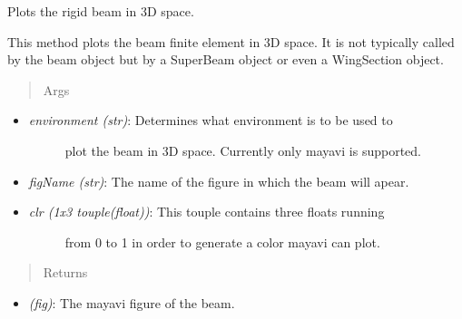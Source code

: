 \documentclass[letterpaper,10pt,english]{sphinxmanual}
\begin{document}
\begin{fulllineitems}
\begin{fulllineitems}
\begin{itemize}
\end{itemize}

\end{fulllineitems}


\begin{fulllineitems}
\label{structures:AeroComBAT.Structures.TBeam.plotRigidBeam}
Plots the rigid beam in 3D space.

This method plots the beam finite element in 3D space. It is not
typically called by the beam object but by a SuperBeam object or
even a WingSection object.
\begin{quote}\begin{description}
\item[{Args}] \leavevmode
\end{description}\end{quote}
\begin{itemize}
\item {} \begin{description}
\item[{\emph{environment (str)}: Determines what environment is to be used to}] \leavevmode
plot the beam in 3D space. Currently only mayavi is supported.

\end{description}

\item {} 
\emph{figName (str)}: The name of the figure in which the beam will apear.

\item {} \begin{description}
\item[{\emph{clr (1x3 touple(float))}: This touple contains three floats running}] \leavevmode
from 0 to 1 in order to generate a color mayavi can plot.

\end{description}

\end{itemize}
\begin{quote}\begin{description}
\item[{Returns}] \leavevmode
\end{description}\end{quote}
\begin{itemize}
\item {} 
\emph{(fig)}: The mayavi figure of the beam.


\end{itemize}
\end{fulllineitems}
\end{fulllineitems}
\end{document}
